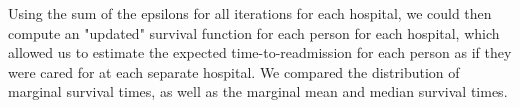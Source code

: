 \documentclass[]{article}\usepackage[]{graphicx}\usepackage[]{color}
\begin{document}
Using the sum of the epsilons for all iterations for each hospital, we could then compute an "updated" survival function for each person for each hospital, which allowed us to estimate the expected time-to-readmission for each person as if they were cared for at each separate hospital. We compared the distribution of marginal survival times, as well as the marginal mean and median survival times.






\end{document}
